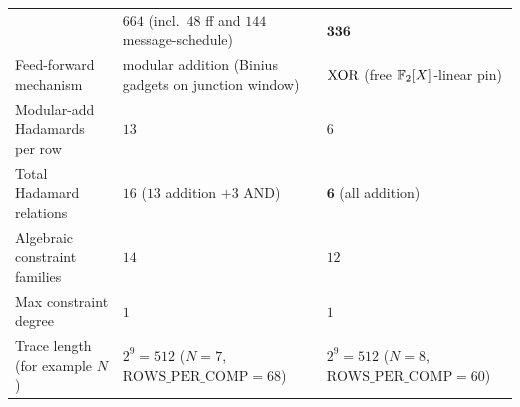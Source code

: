 \begin{center}
\begin{tabular}{lll}
                              & $664$ \quad (incl.\ $48$ ff and $144$ message-schedule) & $\mathbf{336}$ \\
Feed-forward mechanism        & modular addition (Binius gadgets on junction window) & $\operatorname{XOR}$ (free $\mathbb{F}_2[X]$-linear pin) \\
Modular-add Hadamards per row & $13$ & $6$ \\
Total Hadamard relations      & $16$ ($13$ addition $+ 3$ AND) & $\mathbf{6}$ (all addition) \\
Algebraic constraint families & $14$ & $12$ \\
Max constraint degree         & $1$ & $1$ \\
Trace length (for example $N$)
                              & $2^9 = 512$ ($N = 7$, $\mathrm{ROWS\_PER\_COMP} = 68$) & $2^9 = 512$ ($N = 8$, $\mathrm{ROWS\_PER\_COMP} = 60$) \\
\bottomrule
\end{tabular}
\end{center}

